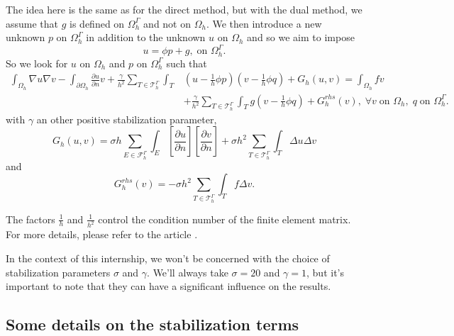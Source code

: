 The idea here is the same as for the direct method, but with the dual method, we assume that $g$ is defined on $\Omega_h^\Gamma$ and not on $\Omega_h$. We then introduce a new unknown $p$ on $\Omega_h^\Gamma$ in addition to the unknown $u$ on $\Omega_h$ and so we aim to impose
\begin{equation*}
	u=\phi p+g, \; \text{on } \Omega_h^\Gamma.
\end{equation*}
So we look for $u$ on $\Omega_h$ and $p$ on $\Omega_h^\Gamma$ such that
\begin{align*}
	\int_{\Omega_h}\nabla u\nabla v-\int_{\partial\Omega_h}\frac{\partial u}{\partial n} v + \frac{\gamma}{h^2} \sum_{T\in\mathcal{T}_h^\Gamma}\int_T &\left(u-\frac{1}{h}\phi p\right)\left(v-\frac{1}{h}\phi q\right) + G_h(u,v) = \int_{\Omega_h}fv \\
	&+ \frac{\gamma}{h^2} \sum_{T\in\mathcal{T}_h^\Gamma}\int_T g\left(v-\frac{1}{h}\phi q\right) + G_h^{rhs}(v), \; \forall v \; \text{on } \Omega_h, \; q \; \text{on } \Omega_h^\Gamma.
\end{align*}
with $\gamma$ an other positive stabilization parameter,
\begin{equation*}
	G_h(u,v)=\sigma h\sum_{E\in\mathcal{F}_h^\Gamma}\int_E\left[\frac{\partial u}{\partial n}\right]\left[\frac{\partial v}{\partial n}\right]+\sigma h^2\sum_{T\in\mathcal{T}_h^\Gamma}\int_T \Delta u\Delta v
\end{equation*}
and
\begin{equation*}
	G_h^{rhs}(v)=-\sigma h^2\sum_{T\in\mathcal{T}_h^\Gamma}\int_T f\Delta v.
\end{equation*}
\begin{Rem}
	The factors $\frac{1}{h}$ and $\frac{1}{h^2}$ control the condition number of the finite element matrix. For more details, please refer to the article \cite{duprez_new_2023}.
\end{Rem}
\begin{Rem}
	In the context of this internship, we won't be concerned with the choice of stabilization parameters $\sigma$ and $\gamma$. We'll always take $\sigma=20$ and $\gamma=1$, but it's important to note that they can have a significant influence on the results.
\end{Rem}

\subsection{Some details on the stabilization terms} \label{FEMs.PhiFEM.stab}  

